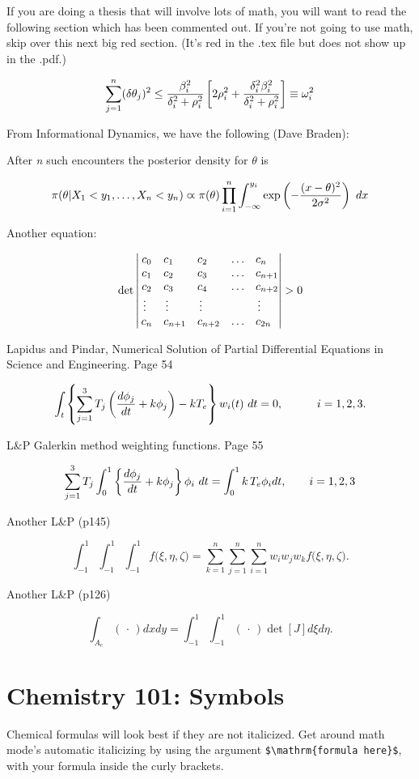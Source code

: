 \documentclass[12pt,twoside]{reedthesis}
\begin{document}
		If you are doing a thesis that will involve lots of math, you will want to read the following section which has been commented out. If you're not going to use math, skip over this next big red section. (It's red in the .tex file but does not show up in the .pdf.)
	
	$$\sum_{j=1}^n (\delta\theta_j)^2 \leq {{\beta_i^2}\over{\delta_i^2 + \rho_i^2}}
\left[ 2\rho_i^2 + {\delta_i^2\beta_i^2\over{\delta_i^2 + \rho_i^2}} \right] \equiv \omega_i^2
$$

From Informational Dynamics, we have the following (Dave Braden):

After {\it n} such encounters the posterior density for $\theta$ is

$$
\pi(\theta|X_1< y_1,\dots,X_n<y_n) \varpropto \pi(\theta) \prod_{i=1}^n\int_{-\infty}^{y_i}
   \exp\left(-{(x-\theta)^2\over{2\sigma^2}}\right)\ dx
$$



Another equation:

$$\det\left|\,\begin{matrix}%
c_0&c_1\hfill&c_2\hfill&\ldots&c_n\hfill\cr
c_1&c_2\hfill&c_3\hfill&\ldots&c_{n+1}\hfill\cr
c_2&c_3\hfill&c_4\hfill&\ldots&c_{n+2}\hfill\cr
\,\vdots\hfill&\,\vdots\hfill&
  \,\vdots\hfill&&\,\vdots\hfill\cr
c_n&c_{n+1}\hfill&c_{n+2}\hfill&\ldots&c_{2n}\hfill\cr
\end{matrix}\right|>0$$


Lapidus and Pindar, Numerical Solution of Partial Differential Equations in Science and
Engineering.  Page 54

$$
\int_t\left\{\sum_{j=1}^3 T_j \left({d\phi_j\over dt}+k\phi_j\right)-kT_e\right\}w_i(t)\ dt=0,
   \qquad\quad i=1,2,3. 
$$

L\&P  Galerkin method weighting functions.  Page 55

$$
\sum_{j=1}^3 T_j\int_0^1\left\{{d\phi_j\over dt} + k\phi_j\right\} \phi_i\ dt 
   = \int_{0}^1k\,T_e\phi_idt, \qquad i=1,2,3 $$
   
Another L\&P (p145)

$$
\int_{-1}^1\!\int_{-1}^1\!\int_{-1}^1 f\big(\xi,\eta,\zeta\big) 
   = \sum_{k=1}^n\sum_{j=1}^n\sum_{i=1}^n w_i w_j w_k f\big( \xi,\eta,\zeta\big).
$$

Another L\&P (p126)

$$
\int_{A_e} (\,\cdot\,) dx dy = \int_{-1}^1\!\int_{-1}^1 (\,\cdot\,) \det[J] d\xi d\eta.
$$

\section{Chemistry 101: Symbols}
Chemical formulas will look best if they are not italicized. Get around math mode's automatic italicizing by using the argument \verb=$\mathrm{formula here}$=, with your formula inside the curly brackets.
\end{document}

